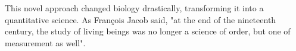 This novel approach changed biology drastically, transforming it into a quantitative science. As Fran\c{c}ois Jacob said, "at the end of the nineteenth century, the study of living beings was no longer a science of order, but one of measurement as well".




